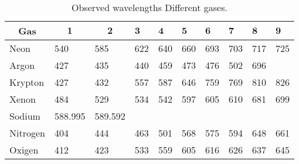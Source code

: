 \begin{table}
    \begin{adjustbox}{width=1\textwidth, center}
        \begin{tabular}{|l|l|l|l|l|l|l|l|l|l|}
            \hline \multicolumn{1}{|c|}{ Gas } & \multicolumn{1}{|c|}{$\mathbf{1}$} & \multicolumn{1}{c|}{$\mathbf{2}$} & $\mathbf{3}$ & $\mathbf{4}$ & $\mathbf{5}$ & $\mathbf{6}$ & $\mathbf{7}$ & $\mathbf{8}$ & $\mathbf{9}$ \\
            \hline Neon                        & 540                                & 585                               & 622          & 640          & 660          & 693          & 703          & 717          & 725          \\
            \hline Argon                       & 427                                & 435                               & 440          & 459          & 473          & 476          & 502          & 696          &              \\
            \hline Krypton                     & 427                                & 432                               & 557          & 587          & 646          & 759          & 769          & 810          & 826          \\
            \hline Xenon                       & 484                                & 529                               & 534          & 542          & 597          & 605          & 610          & 681          & 699          \\
            \hline Sodium                      & 588.995                            & 589.592                           &              &              &              &              &              &              &              \\
            \hline Nitrogen                    & 404                                & 444                               & 463          & 501          & 568          & 575          & 594          & 648          & 661          \\
            \hline Oxigen                      & 412                                & 423                               & 533          & 559          & 605          & 616          & 626          & 637          & 645          \\
            \hline
        \end{tabular}
    \end{adjustbox}
    \caption{Observed wavelengths Different gases.}
    \label{tab:differentGases}
\end{table}


